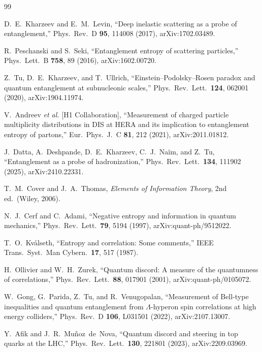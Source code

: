 \documentclass[11pt]{article}
\begin{document}
\begin{thebibliography}{99}

D.~E.~Kharzeev and E.~M.~Levin,
``Deep inelastic scattering as a probe of entanglement,''
Phys.\ Rev.\ D \textbf{95}, 114008 (2017),
arXiv:1702.03489.

R.~Peschanski and S.~Seki,
``Entanglement entropy of scattering particles,''
Phys.\ Lett.\ B \textbf{758}, 89 (2016),
arXiv:1602.00720.

Z.~Tu, D.~E.~Kharzeev, and T.~Ullrich,
``Einstein--Podolsky--Rosen paradox and quantum entanglement at
subnucleonic scales,''
Phys.\ Rev.\ Lett.\ \textbf{124}, 062001 (2020),
arXiv:1904.11974.

V.~Andreev \emph{et al.} [H1 Collaboration],
``Measurement of charged particle multiplicity distributions in DIS at
HERA and its implication to entanglement entropy of partons,''
Eur.\ Phys.\ J.\ C \textbf{81}, 212 (2021),
arXiv:2011.01812.

J.~Datta, A.~Deshpande, D.~E.~Kharzeev, C.~J.~Na\"im, and Z.~Tu,
``Entanglement as a probe of hadronization,''
Phys.\ Rev.\ Lett.\ \textbf{134}, 111902 (2025),
arXiv:2410.22331.

T.~M.~Cover and J.~A.~Thomas,
\emph{Elements of Information Theory}, 2nd ed.\ (Wiley, 2006).

N.~J.~Cerf and C.~Adami,
``Negative entropy and information in quantum mechanics,''
Phys.\ Rev.\ Lett.\ \textbf{79}, 5194 (1997),
arXiv:quant-ph/9512022.

T.~O.~Kv\aa{}lseth,
``Entropy and correlation: Some comments,''
IEEE Trans.\ Syst.\ Man Cybern.\ \textbf{17}, 517 (1987).

H.~Ollivier and W.~H.~Zurek,
``Quantum discord: A measure of the quantumness of correlations,''
Phys.\ Rev.\ Lett.\ \textbf{88}, 017901 (2001),
arXiv:quant-ph/0105072.

W.~Gong, G.~Parida, Z.~Tu, and R.~Venugopalan,
``Measurement of Bell-type inequalities and quantum entanglement from
$\Lambda$-hyperon spin correlations at high energy colliders,''
Phys.\ Rev.\ D \textbf{106}, L031501 (2022),
arXiv:2107.13007.

Y.~Afik and J.~R.~Mu\~noz~de~Nova,
``Quantum discord and steering in top quarks at the LHC,''
Phys.\ Rev.\ Lett.\ \textbf{130}, 221801 (2023),
arXiv:2209.03969.


\end{thebibliography}
\end{document}
